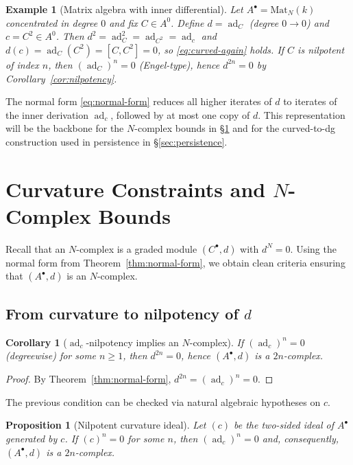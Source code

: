 \documentclass[preprint,12pt]{elsarticle}
\newcommand{\ad}{\operatorname{ad}}
\newtheorem{exmp}[defi]{Example}
\newtheorem{prop}{Proposition}
\newtheorem{cor}[thm]{Corollary}
\begin{document}
\begin{exmp}[Matrix algebra with inner differential]\label{exa:matrix}
Let $A^\bullet=\mathrm{Mat}_N(k)$ concentrated in degree $0$ and fix $C\in A^0$.
Define $d=\ad_C$ (degree $0\to 0$) and $c=C^2\in A^0$. Then $d^2=\ad_{C}^2=\ad_{C^2}=\ad_c$ and $d(c)=\ad_C(C^2)=[C,C^2]=0$,
so \eqref{eq:curved-again} holds. If $C$ is nilpotent of index $n$, then $(\ad_C)^n=0$ (Engel-type), hence $d^{2n}=0$ by
Corollary~\ref{cor:nilpotency}.
\end{exmp}

The normal form \eqref{eq:normal-form} reduces all higher iterates of $d$ to iterates of the inner derivation $\ad_c$,
followed by at most one copy of $d$. This representation will be the backbone for the $N$-complex bounds in §\ref{sec:ncomplex}
and for the curved-to-dg construction used in persistence in §\ref{sec:persistence}.

\section{Curvature Constraints and $N$-Complex Bounds}\label{sec:ncomplex}

Recall that an $N$-complex is a graded module $(C^\bullet,d)$ with $d^N=0$.
Using the normal form from Theorem~\ref{thm:normal-form}, we obtain clean
criteria ensuring that $(A^\bullet,d)$ is an $N$-complex.

\subsection{From curvature to nilpotency of $d$}

\begin{cor}[$\ad_c$-nilpotency implies an $N$-complex]\label{cor:n-from-ad}
If $(\ad_c)^n=0$ (degreewise) for some $n\ge 1$, then $d^{2n}=0$, hence $(A^\bullet,d)$
is a $2n$-complex.
\end{cor}

\begin{proof}
By Theorem~\ref{thm:normal-form}, $d^{2n}=(\ad_c)^n=0$.
\end{proof}

The previous condition can be checked via natural algebraic hypotheses on $c$.

\begin{prop}[Nilpotent curvature ideal]\label{prop:nil-ideal-again}
Let $(c)$ be the two-sided ideal of $A^\bullet$ generated by $c$. If $(c)^n=0$ for some $n$,
then $(\ad_c)^n=0$ and, consequently, $(A^\bullet,d)$ is a $2n$-complex.
\end{prop}
\end{document}
